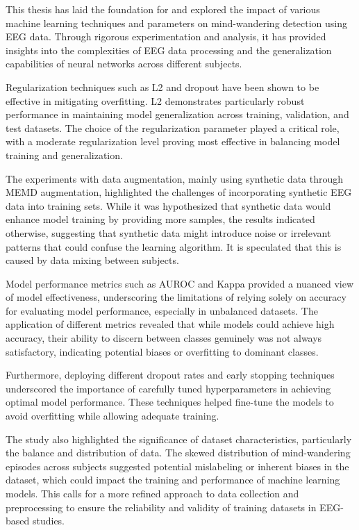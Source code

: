 
This thesis has laid the foundation for and explored the impact of various machine learning techniques and parameters on mind-wandering detection using EEG data. Through rigorous experimentation and analysis, it has provided insights into the complexities of EEG data processing and the generalization capabilities of neural networks across different subjects.

Regularization techniques such as L2 and dropout have been shown to be effective in mitigating overfitting. L2 demonstrates particularly robust performance in maintaining model generalization across training, validation, and test datasets. The choice of the regularization parameter played a critical role, with a moderate regularization level proving most effective in balancing model training and generalization.

The experiments with data augmentation, mainly using synthetic data through MEMD augmentation, highlighted the challenges of incorporating synthetic EEG data into training sets. While it was hypothesized that synthetic data would enhance model training by providing more samples, the results indicated otherwise, suggesting that synthetic data might introduce noise or irrelevant patterns that could confuse the learning algorithm. It is speculated that this is caused by data mixing between subjects.

Model performance metrics such as AUROC and Kappa provided a nuanced view of model effectiveness, underscoring the limitations of relying solely on accuracy for evaluating model performance, especially in unbalanced datasets. The application of different metrics revealed that while models could achieve high accuracy, their ability to discern between classes genuinely was not always satisfactory, indicating potential biases or overfitting to dominant classes.

Furthermore, deploying different dropout rates and early stopping techniques underscored the importance of carefully tuned hyperparameters in achieving optimal model performance. These techniques helped fine-tune the models to avoid overfitting while allowing adequate training.

The study also highlighted the significance of dataset characteristics, particularly the balance and distribution of data. The skewed distribution of mind-wandering episodes across subjects suggested potential mislabeling or inherent biases in the dataset, which could impact the training and performance of machine learning models. This calls for a more refined approach to data collection and preprocessing to ensure the reliability and validity of training datasets in EEG-based studies.


